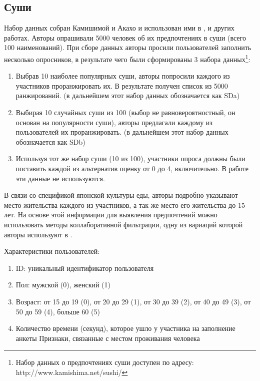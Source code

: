 	\subsection{Суши}
		Набор данных собран Камишимой и Акахо и использован ими в \cite{Kamishima:2003}, \cite{Kamishima:2006} и других работах. Авторы опрашивали 5000 человек об их предпочтениях в суши (всего 100 наименований). При сборе данных авторы просили пользователей заполнить несколько опросников, в результате чего были сформированы 3 набора данных\footnote{Набор данных о предпочтениях суши доступен по адресу: http://www.kamishima.net/sushi/}:
		\begin{enumerate}[itemsep=-1.5mm]
			\item Выбрав 10 наиболее популярных суши, авторы попросили каждого из участников проранжировать их. В результате получен список из 5000 ранжирований. (в дальнейшем этот набор данных обозначается как SDa)
			\item Выбирая 10 случайных суши из 100 (выбор не равновероятностный, он основан на популярности суши), авторы предлагали каждому из пользователей их проранжировать. (в дальнейшем этот набор данных обозначается как SDb)
			\item Используя тот же набор суши (10 из 100), участники опроса должны были поставить каждой из альтернатив оценку от 0 до 4, включительно. В работе эти данные не используются.
		\end{enumerate}
		
		В связи со спецификой японской культуры еды, авторы подробно указывают место жительства каждого из участников, а так же место его жительства до 15 лет. На основе этой информации для выявления предпочтений можно использовать методы коллаборативной фильтрации\cite{Ricci:2011}, одну из вариаций которой авторы используют в \cite{Kamishima:2003}.
		
		\vspace{1em}
		
		\noindent Характеристики пользователей:
		\vspace{-0.7em}
		\begin{enumerate}[itemsep=-1.5mm]
			\item ID: уникальный идентификатор пользователя
			\item Пол: мужской (0), женский (1)
			\item Возраст: от 15 до 19 (0), от 20 до 29 (1), от 30 до 39 (2), от 40 до 49 (3), от 50 до 59 (4), больше 60 (5)
			\item Количество времени (секунд), которое ушло у участника на заполнение анкеты
			 Признаки, связанные с местом проживания человека
		\end{enumerate}
		
